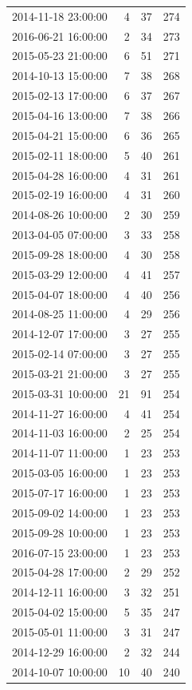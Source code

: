 \begin{tabular}{lrrr}
2014-11-18 23:00:00 & 4 & 37 & 274 \\
2016-06-21 16:00:00 & 2 & 34 & 273 \\
2015-05-23 21:00:00 & 6 & 51 & 271 \\
2014-10-13 15:00:00 & 7 & 38 & 268 \\
2015-02-13 17:00:00 & 6 & 37 & 267 \\
2015-04-16 13:00:00 & 7 & 38 & 266 \\
2015-04-21 15:00:00 & 6 & 36 & 265 \\
2015-02-11 18:00:00 & 5 & 40 & 261 \\
2015-04-28 16:00:00 & 4 & 31 & 261 \\
2015-02-19 16:00:00 & 4 & 31 & 260 \\
2014-08-26 10:00:00 & 2 & 30 & 259 \\
2013-04-05 07:00:00 & 3 & 33 & 258 \\
2015-09-28 18:00:00 & 4 & 30 & 258 \\
2015-03-29 12:00:00 & 4 & 41 & 257 \\
2015-04-07 18:00:00 & 4 & 40 & 256 \\
2014-08-25 11:00:00 & 4 & 29 & 256 \\
2014-12-07 17:00:00 & 3 & 27 & 255 \\
2015-02-14 07:00:00 & 3 & 27 & 255 \\
2015-03-21 21:00:00 & 3 & 27 & 255 \\
2015-03-31 10:00:00 & 21 & 91 & 254 \\
2014-11-27 16:00:00 & 4 & 41 & 254 \\
2014-11-03 16:00:00 & 2 & 25 & 254 \\
2014-11-07 11:00:00 & 1 & 23 & 253 \\
2015-03-05 16:00:00 & 1 & 23 & 253 \\
2015-07-17 16:00:00 & 1 & 23 & 253 \\
2015-09-02 14:00:00 & 1 & 23 & 253 \\
2015-09-28 10:00:00 & 1 & 23 & 253 \\
2016-07-15 23:00:00 & 1 & 23 & 253 \\
2015-04-28 17:00:00 & 2 & 29 & 252 \\
2014-12-11 16:00:00 & 3 & 32 & 251 \\
2015-04-02 15:00:00 & 5 & 35 & 247 \\
2015-05-01 11:00:00 & 3 & 31 & 247 \\
2014-12-29 16:00:00 & 2 & 32 & 244 \\
2014-10-07 10:00:00 & 10 & 40 & 240 \\

\end{tabular}
